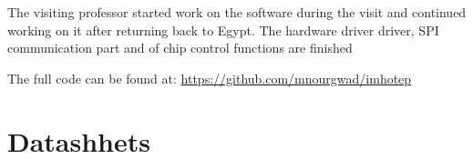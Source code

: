 \documentclass[%
DIV=12,
abstract=on
12pt,			%
]
{scrartcl} %
\begin{document}
The visiting professor started work on the software during the visit and continued working on it after returning back to Egypt. The hardware driver driver, SPI communication part and of chip control functions are finished 

\vspace{0.3cm}%
\noindent\colorbox{myLavender!15}{\parbox{\textwidth}{\vspace{0.1cm}%
The full code can be found at: \url{https://github.com/mnourgwad/imhotep}
        \vspace{0.1cm}}}


\newpage


\newpage


\newpage


\nocite{*}

%


\newpage
\appendix

\section{Datashhets}\label{ch:Datasheet}

\end{document}
